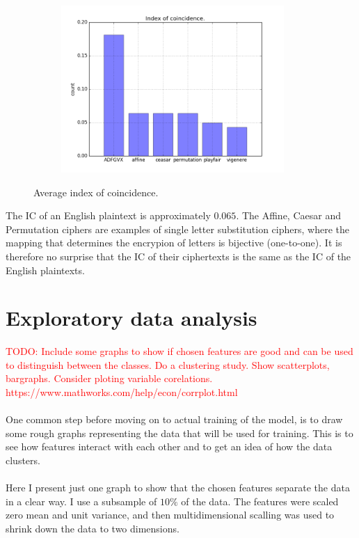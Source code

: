 \documentclass[a4paper]{article}
\begin{document}
\begin{figure}[H]
    \centering
    \begin{subfigure}[h]{0.5\textwidth}
        \centering
        \includegraphics[height=2.5in]{img/iocs.png}
    \end{subfigure}
    \caption{Average index of coincidence.}
    \label{fig:ioc}
\end{figure}

The IC of an English plaintext is approximately $0.065$. The Affine, Caesar and Permutation ciphers are examples of single letter substitution ciphers, where the mapping that determines the encrypion of letters is bijective (one-to-one). It is therefore no surprise that the IC of their ciphertexts is the same as the IC of the English plaintexts.

\section*{Exploratory data analysis}
\textcolor{red}{TODO: Include some graphs to show if chosen features are good and can be used to distinguish between the classes. Do a clustering study. Show scatterplots, bargraphs. Consider ploting variable corelations. https://www.mathworks.com/help/econ/corrplot.html}\\
\\
One common step before moving on to actual training of the model, is to draw some rough graphs representing the data that will be used for training. This is to see how features interact with each other and to get an idea of how the data clusters.\\
\\
Here I present just one graph to show that the chosen features separate the data in a clear way. I use a subsample of $10\%$ of the data. The features were scaled zero mean and unit variance, and then multidimensional scalling was used to shrink down the data to two dimensions.
\end{document}
